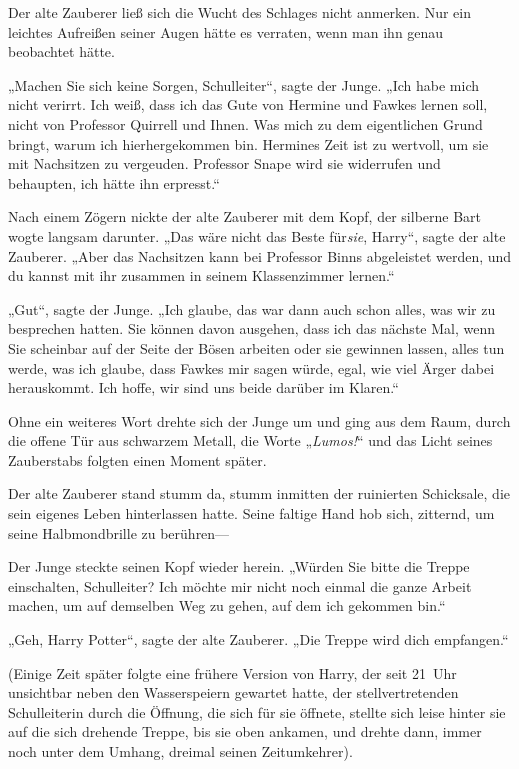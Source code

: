 {Der alte Zauberer ließ sich die Wucht des Schlages nicht anmerken. Nur ein leichtes Aufreißen seiner Augen hätte es verraten, wenn man ihn genau beobachtet hätte.

„Machen Sie sich keine Sorgen, Schulleiter“, sagte der Junge. „Ich habe mich nicht verirrt. Ich weiß, dass ich das Gute von Hermine und Fawkes lernen soll, nicht von Professor Quirrell und Ihnen. Was mich zu dem eigentlichen Grund bringt, warum ich hierhergekommen bin. Hermines Zeit ist zu wertvoll, um sie mit Nachsitzen zu vergeuden. Professor Snape wird sie widerrufen und behaupten, ich hätte ihn erpresst.“

Nach einem Zögern nickte der alte Zauberer mit dem Kopf, der silberne Bart wogte langsam darunter. „Das wäre nicht das Beste für\emph{sie}, Harry“, sagte der alte Zauberer. „Aber das Nachsitzen kann bei Professor Binns abgeleistet werden, und du kannst mit ihr zusammen in seinem Klassenzimmer lernen.“

„Gut“, sagte der Junge. „Ich glaube, das war dann auch schon alles, was wir zu besprechen hatten. Sie können davon ausgehen, dass ich das nächste Mal, wenn Sie scheinbar auf der Seite der Bösen arbeiten oder sie gewinnen lassen, alles tun werde, was ich glaube, dass Fawkes mir sagen würde, egal, wie viel Ärger dabei herauskommt. Ich hoffe, wir sind uns beide darüber im Klaren.“

Ohne ein weiteres Wort drehte sich der Junge um und ging aus dem Raum, durch die offene Tür aus schwarzem Metall, die Worte „\emph{Lumos!}“ und das Licht seines Zauberstabs folgten einen Moment später.

Der alte Zauberer stand stumm da, stumm inmitten der ruinierten Schicksale, die sein eigenes Leben hinterlassen hatte. Seine faltige Hand hob sich, zitternd, um seine Halbmondbrille zu berühren—

Der Junge steckte seinen Kopf wieder herein. „Würden Sie bitte die Treppe einschalten, Schulleiter? Ich möchte mir nicht noch einmal die ganze Arbeit machen, um auf demselben Weg zu gehen, auf dem ich gekommen bin.“

„Geh, Harry Potter“, sagte der alte Zauberer. „Die Treppe wird dich empfangen.“

(Einige Zeit später folgte eine frühere Version von Harry, der seit 21~Uhr unsichtbar neben den Wasserspeiern gewartet hatte, der stellvertretenden Schulleiterin durch die Öffnung, die sich für sie öffnete, stellte sich leise hinter sie auf die sich drehende Treppe, bis sie oben ankamen, und drehte dann, immer noch unter dem Umhang, dreimal seinen Zeitumkehrer).

}
